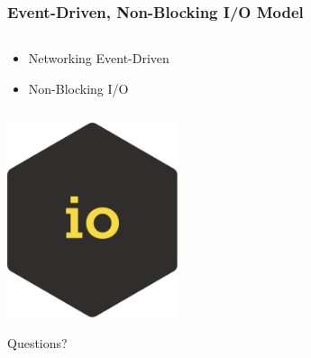 \documentclass{beamer}
\begin{document}
\begin{frame}
	\frametitle{Event-Driven, Non-Blocking I/O Model}
	\begin{columns}[c]
		\begin{column}{30cm}
			\vspace{.1cm}
			\begin{itemize}
				\justifying
				\item Networking Event-Driven
				\item Non-Blocking I/O
			\end{itemize}
		\end{column}
	\end{columns}
	\vspace{.5cm}
	\hspace*{5.5cm} \includegraphics[width=5cm]{figs/io.png}
\end{frame}

\begin{frame}
	\vspace{1cm}
	\begin{Huge}
		\begin{center}
			Questions?
		\end{center}
	\end{Huge}
\end{frame}
\end{document}
